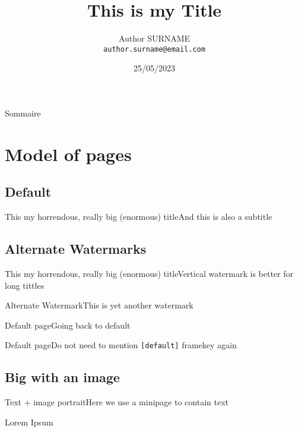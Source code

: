 \documentclass[aspectratio=169]{laplace-beamer}
\title[Short Version of the Title]
{This is my Title}
\author[Author SURNAME] %
{Author SURNAME\\
\texttt{author.surname@email.com}}
\date{25/05/2023}
\begin{document}
\begin{frame}[plain]
\end{frame}

\begin{frame}{Sommaire}
  \tableofcontents[subsectionstyle=hide/hide/hide]
\end{frame}

\section{Model of pages}
\subsection{Default}
\begin{frame}{This my horrendous, really big (enormous) title}{And this is also a subtitle}
    \lipsum[1][6]
\end{frame}

\subsection{Alternate Watermarks}
\begin{frame}{This my horrendous, really big (enormous) title}{Vertical watermark is better for long tittles}
    \lipsum[1][5]
\end{frame}

\begin{frame}{Alternate Watermark}{This is yet another watermark}
    \lipsum[1][2]
\end{frame}

\begin{frame}[default]{Default page}{Going back to default}
    \lipsum[1][1]
\end{frame}

\begin{frame}{Default page}{Do not need to mention \texttt{[default]} framekey again}
    \lipsum[1][1]
\end{frame}

\subsection{Big with an image}
\begin{frame}[big_image_right={banque/Image20.jpg}]{Text + image portrait}{Here we use a minipage to contain text}
  \begin{minipage}{.45\textwidth}
    \begin{block}{Lorem Ipsum}
      \lipsum[1][1-6]
    \end{block}
  \end{minipage}
\end{frame}
\end{document}
